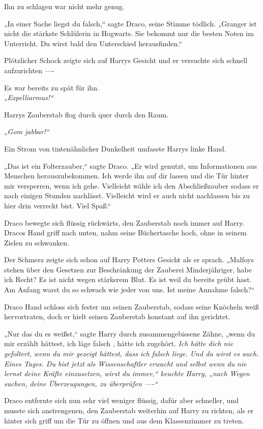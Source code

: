 {Ihn zu schlagen war nicht mehr genug.

„In einer Sache liegst du falsch,“ sagte Draco, seine Stimme tödlich. „Granger ist nicht die stärkste Schlülerin in Hogwarts. Sie bekommt nur die besten Noten im Unterricht. Du wirst bald den Unterschied herausfinden.“

Plötzlicher Schock zeigte sich auf Harrys Gesicht und er versuchte sich schnell aufzurichten ----

Es war bereits zu spät für ihn.\\ „\emph{Expelliarmus!“}

Harrys Zauberstab flog durch quer durch den Raum.

„\emph{Gom jabbar!“}

Ein Strom von tintenähnlicher Dunkelheit umfasste Harrys linke Hand.

„Das ist ein Folterzauber,“ sagte Draco. „Er wird genutzt, um Informationen aus Menschen herauszubekommen. Ich werde ihn auf dir lassen und die Tür hinter mir versperren, wenn ich gehe. Vielleicht wähle ich den Abschließzauber sodass er nach einigen Stunden nachlässt. Vielleicht wird er auch nicht nachlassen bis zu hier drin verreckt bist. Viel Spaß.“

Draco bewegte sich flüssig rückwärts, den Zauberstab noch immer auf Harry. Dracos Hand griff nach unten, nahm seine Büchertasche hoch, ohne in seinem Zielen zu schwanken.

Der Schmerz zeigte sich schon auf Harry Potters Gesicht als er sprach. „Malfoys stehen über den Gesetzen zur Beschränkung der Zauberei Minderjähriger, habe ich Recht? Es ist nicht wegen stärkerem Blut. Es ist weil du bereits geübt hast. Am Anfang warst du so schwach wie jeder von uns. Ist meine Annahme falsch?“

Draco Hand schloss sich fester um seinen Zauberstab, sodass seine Knöcheln weiß hervortraten, doch er hielt seinen Zauberstab konstant auf ihn gerichtet.

„Nur das du es weißst,“ sagte Harry durch zusammengebissene Zähne, „wenn du mir erzählt hättest, ich läge falsch , hätte ich zugehört. \emph{Ich hätte dich nie gefoltert, wenn du mir gezeigt hättest, dass ich falsch liege. Und du wirst es auch. Eines Tages. Du bist jetzt als Wissenschaftler erwacht und selbst wenn du nie lernst deine Kräfte einzusetzen, wirst du immer,“ keuchte Harry, „nach Wegen suchen, deine Überzeugungen, zu überprüfen ----“}

Draco entfernte sich nun sehr viel weniger flüssig, dafür aber schneller, und musste sich anstrengenen, den Zauberstab weiterhin auf Harry zu richten, als er hinter sich griff um die Tür zu öffnen und aus dem Klassenzimmer zu treten.

}
